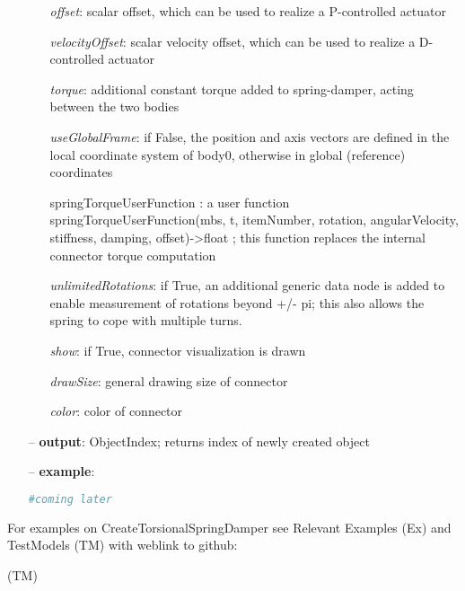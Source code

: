 \begin{itemize}[leftmargin=0.7cm]
\begin{itemize}[leftmargin=1.2cm]
\item[]{\it offset}: scalar offset, which can be used to realize a P-controlled actuator
\item[]{\it velocityOffset}: scalar velocity offset, which can be used to realize a D-controlled actuator
\item[]{\it torque}: additional constant torque added to spring-damper, acting between the two bodies
\item[]{\it useGlobalFrame}: if False, the position and axis vectors are defined in the local coordinate system of body0, otherwise in global (reference) coordinates
\item[]springTorqueUserFunction : a user function springTorqueUserFunction(mbs, t, itemNumber, rotation, angularVelocity, stiffness, damping, offset)->float ; this function replaces the internal connector torque computation
\item[]{\it unlimitedRotations}: if True, an additional generic data node is added to enable measurement of rotations beyond +/- pi; this also allows the spring to cope with multiple turns.
\item[]{\it show}: if True, connector visualization is drawn
\item[]{\it drawSize}: general drawing size of connector
\item[]{\it color}: color of connector
\end{itemize}
\item[--]
{\bf output}: ObjectIndex; returns index of newly created object
\item[--]
{\bf example}: \vspace{-12pt}\ei\begin{lstlisting}[language=Python, xleftmargin=36pt]
  #coming later
\end{lstlisting}\vspace{-24pt}\bi\item[]\vspace{-24pt}\vspace{12pt}\end{itemize}
%

%
\noindent For examples on CreateTorsionalSpringDamper see Relevant Examples (Ex) and TestModels (TM) with weblink to github:
\bi
 \item \footnotesize {} (TM)
\ei

